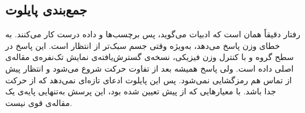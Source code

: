 \subsection{جمع‌بندی پایلوت}

\begin{table}[H]
\centering
\caption{شرط‌های قبول که پیش از دیدن نتیجه ثبت شده بودند، و نتیجه‌ی هر تحلیل.}
\label{tab:pe-verdict}

\end{table}

رفتار دقیقاً همان است که ادبیات می‌گوید، پس برچسب‌ها و داده درست کار می‌کنند.  به خطای وزن پاسخ می‌دهد، به‌ویژه وقتی جسم سبک‌تر از انتظار است. این پاسخ در سطح گروه و با کنترل وزن فیزیکی، نسخه‌ی گسترش‌یافته‌ی نمایش تک‌نفره‌ی مقاله‌ی اصلی داده است. ولی پاسخ  همیشه بعد از تفاوت حرکت شروع می‌شود و انتظار پیش از تماس هم رمزگشایی نمی‌شود. پس این پایلوت ادعای تازه‌ای نمی‌دهد که از حرکت جدا باشد. با معیارهایی که از پیش تعیین شده بود، این پرسش به‌تنهایی پایه‌ی یک مقاله‌ی قوی نیست.

\newpage
